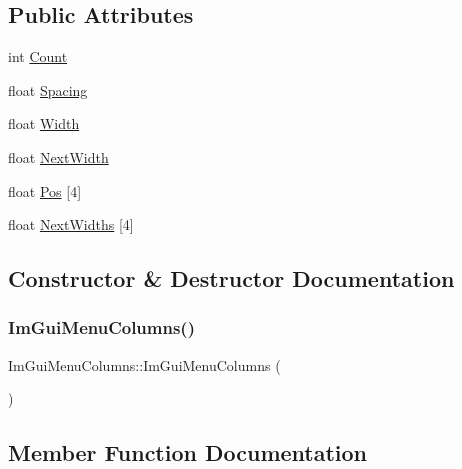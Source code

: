 \subsection*{Public Attributes}
\begin{DoxyCompactItemize}
\item 
int \mbox{\hyperlink{struct_im_gui_menu_columns_af466eaa48622ff8c431b99cf46719ba5}{Count}}
\item 
float \mbox{\hyperlink{struct_im_gui_menu_columns_afed09334fed58658bc891f4c65106cb4}{Spacing}}
\item 
float \mbox{\hyperlink{struct_im_gui_menu_columns_a3cca7e65a4625a41a4b9c59c1aaea15d}{Width}}
\item 
float \mbox{\hyperlink{struct_im_gui_menu_columns_a0882d287ca8718a3b5b92d0d00df839d}{Next\+Width}}
\item 
float \mbox{\hyperlink{struct_im_gui_menu_columns_a048b77c3ebe6e6f2c8947686503aa7b4}{Pos}} \mbox{[}4\mbox{]}
\item 
float \mbox{\hyperlink{struct_im_gui_menu_columns_a458212d39dfc83dee9e5deb28c05ebd5}{Next\+Widths}} \mbox{[}4\mbox{]}
\end{DoxyCompactItemize}


\subsection{Constructor \& Destructor Documentation}
\mbox{\label{struct_im_gui_menu_columns_ac476e04a9d907280b3ccdfc429845803}} 
\subsubsection{\texorpdfstring{Im\+Gui\+Menu\+Columns()}{ImGuiMenuColumns()}}
{\footnotesize\ttfamily Im\+Gui\+Menu\+Columns\+::\+Im\+Gui\+Menu\+Columns (\begin{DoxyParamCaption}{ }\end{DoxyParamCaption})}



\subsection{Member Function Documentation}
\mbox{\label{struct_im_gui_menu_columns_a56aa33999066e80cab3ca37ac2e9ba37}} 
